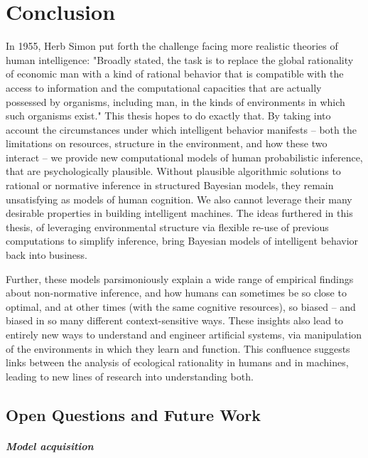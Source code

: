 \chapter{Conclusion}
\label{chap:conclusion}

In 1955, Herb Simon put forth the challenge facing more realistic theories of human intelligence: "Broadly stated, the task is to replace the global rationality of economic man with a kind of rational behavior that is compatible with the access to information and the computational capacities that are actually possessed by organisms, including man, in the kinds of environments in which such organisms exist." This thesis hopes to do exactly that. By taking into account the circumstances under which intelligent behavior manifests -- both the limitations on resources, structure in the environment, and how these two interact -- we provide new computational models of human probabilistic inference, that are psychologically plausible. Without plausible algorithmic solutions to rational or normative inference in structured Bayesian models, they remain unsatisfying as models of human cognition. We also cannot leverage their many desirable properties in building intelligent machines. The ideas furthered in this thesis, of leveraging environmental structure via flexible re-use of previous computations to simplify inference, bring Bayesian models of intelligent behavior back into business.

Further, these models parsimoniously explain a wide range of empirical findings about non-normative inference, and how humans can sometimes be so close to optimal, and at other times (with the same cognitive resources), so biased -- and biased in so many different context-sensitive ways. These insights also lead to entirely new ways to understand and engineer artificial systems, via manipulation of the environments in which they learn and function. This confluence suggests links between the analysis of ecological rationality in humans and in machines, leading to new lines of research into understanding both.

\section*{Open Questions and Future Work}

\paragraph{Model acquisition}


